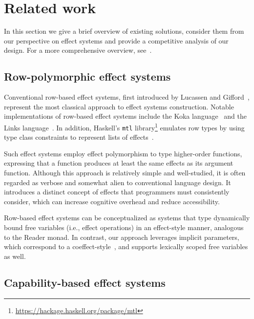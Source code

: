 \documentclass[acmsmall,review,screen]{acmart}
\begin{document}

\section{Related work} \label{sec:related}

In this section we give a brief overview of existing solutions, consider them from our perspective on effect systems and provide a competitive analysis of our design.
For a more comprehensive overview, see~\cite{stoyan2024modern}.

\subsection{Row-polymorphic effect systems} \label{subsec:overview-rows}

Conventional row-based effect systems, first introduced by Lucassen and Gifford~\cite{lucassen1988polymorphic}, represent the most classical approach to effect systems construction.
Notable implementations of row-based effect systems include the Koka language~\cite{leijen2014koka, leijen2017type} and the Links language~\cite{hillerstrom2016liberating}.
In addition, Haskell's \texttt{mtl} library\footnote{\url{https://hackage.haskell.org/package/mtl}} emulates row types by using type class constraints to represent lists of effects~\cite{jones1995functional}.

Such effect systems employ effect polymorphism to type higher-order functions, expressing that a function produces at least the same effects as its argument function.
Although this approach is relatively simple and well-studied, it is often regarded as verbose and somewhat alien to conventional language design.
It introduces a distinct concept of effects that programmers must consistently consider, which can increase cognitive overhead and reduce accessibility.

Row-based effect systems can be conceptualized as systems that type dynamically bound free variables (i.e., effect operations) in an effect-style manner, analogous to the Reader monad.
In contrast, our approach leverages implicit parameters, which correspond to a coeffect-style~\cite{petricek2014coeffects}, and supports lexically scoped free variables as well.

\subsection{Capability-based effect systems} \label{subsec:overview-caps}
\end{document}
